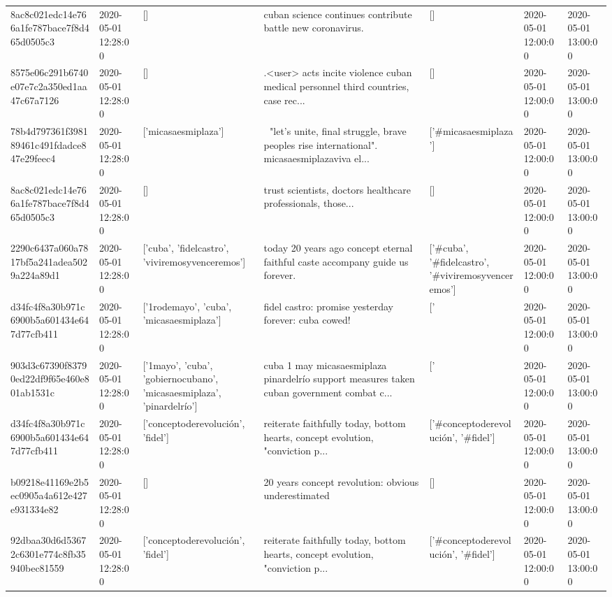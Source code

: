 \begin{tabular}{lllllll}
8ac8c021edc14e766a1fe787bace7f8d465d0505c3 & 2020-05-01 12:28:00 & [] & cuban science continues contribute battle new coronavirus. & [] & 2020-05-01 12:00:00 & 2020-05-01 13:00:00 \\
8575e06c291b6740e07e7c2a350ed1aa47c67a7126 & 2020-05-01 12:28:00 & [] & .<user> acts incite violence cuban medical personnel third countries, case rec... & [] & 2020-05-01 12:00:00 & 2020-05-01 13:00:00 \\
78b4d797361f398189461c491fdadce847e29feec4 & 2020-05-01 12:28:00 & ['micasaesmiplaza'] & 🎵 "let's unite, final struggle, brave peoples rise international". micasaesmiplazaviva el... & ['#micasaesmiplaza'] & 2020-05-01 12:00:00 & 2020-05-01 13:00:00 \\
8ac8c021edc14e766a1fe787bace7f8d465d0505c3 & 2020-05-01 12:28:00 & [] & trust scientists, doctors healthcare professionals, those... & [] & 2020-05-01 12:00:00 & 2020-05-01 13:00:00 \\
2290c6437a060a7817bf5a241adea5029a224a89d1 & 2020-05-01 12:28:00 & ['cuba', 'fidelcastro', 'viviremosyvenceremos'] & today 20 years ago concept eternal faithful caste accompany guide us forever. & ['#cuba', '#fidelcastro', '#viviremosyvenceremos'] & 2020-05-01 12:00:00 & 2020-05-01 13:00:00 \\
d34fc4f8a30b971c6900b5a601434e647d77cfb411 & 2020-05-01 12:28:00 & ['1rodemayo', 'cuba', 'micasaesmiplaza'] & fidel castro: promise yesterday forever: cuba cowed! & ['#1rodemayo', '#cuba', '#micasaesmiplaza'] & 2020-05-01 12:00:00 & 2020-05-01 13:00:00 \\
903d3c67390f83790ed22df9f65e460e801ab1531c & 2020-05-01 12:28:00 & ['1mayo', 'cuba', 'gobiernocubano', 'micasaesmiplaza', 'pinardelrío'] & cuba 1 may micasaesmiplaza pinardelrío support measures taken cuban government combat c... & ['#1mayo', '#cuba', '#micasaesmiplaza'] & 2020-05-01 12:00:00 & 2020-05-01 13:00:00 \\
d34fc4f8a30b971c6900b5a601434e647d77cfb411 & 2020-05-01 12:28:00 & ['conceptoderevolución', 'fidel'] & reiterate faithfully today, bottom hearts, concept evolution, "conviction p... & ['#conceptoderevolución', '#fidel'] & 2020-05-01 12:00:00 & 2020-05-01 13:00:00 \\
b09218e41169e2b5ec0905a4a612e427e931334e82 & 2020-05-01 12:28:00 & [] & 20 years concept revolution: obvious underestimated & [] & 2020-05-01 12:00:00 & 2020-05-01 13:00:00 \\
92dbaa30d6d53672c6301e774c8fb35940bec81559 & 2020-05-01 12:28:00 & ['conceptoderevolución', 'fidel'] & reiterate faithfully today, bottom hearts, concept evolution, "conviction p... & ['#conceptoderevolución', '#fidel'] & 2020-05-01 12:00:00 & 2020-05-01 13:00:00 \\

\end{tabular}
